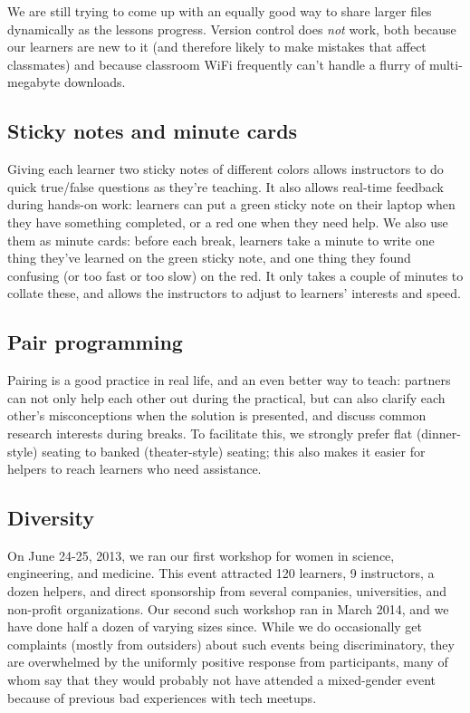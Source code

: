 \documentclass[10pt,a4paper,twocolumn]{article}
\begin{document}
We are still trying to come up with an equally good way to share
larger files dynamically as the lessons progress.  Version control
does \emph{not} work, both because our learners are new to it (and
therefore likely to make mistakes that affect classmates) and because
classroom WiFi frequently can't handle a flurry of multi-megabyte
downloads.

\subsection*{Sticky notes and minute cards}

Giving each learner two sticky notes of different colors allows
instructors to do quick true/false questions as they're teaching. It
also allows real-time feedback during hands-on work: learners can put
a green sticky note on their laptop when they have something
completed, or a red one when they need help. We also use them as
minute cards: before each break, learners take a minute to write one
thing they've learned on the green sticky note, and one thing they
found confusing (or too fast or too slow) on the red. It only takes a
couple of minutes to collate these, and allows the instructors to
adjust to learners' interests and speed.

\subsection*{Pair programming}

Pairing is a good practice in real life, and an even better way to
teach: partners can not only help each other out during the practical,
but can also clarify each other's misconceptions when the solution is
presented, and discuss common research interests during breaks. To
facilitate this, we strongly prefer flat (dinner-style) seating to
banked (theater-style) seating; this also makes it easier for helpers
to reach learners who need assistance.

\subsection*{Diversity}

On June 24-25, 2013, we ran our first workshop for women in science,
engineering, and medicine. This event attracted 120 learners, 9
instructors, a dozen helpers, and direct sponsorship from several
companies, universities, and non-profit organizations. Our second such
workshop ran in March 2014, and we have done half a dozen of varying
sizes since.  While we do occasionally get complaints (mostly from
outsiders) about such events being discriminatory, they are
overwhelmed by the uniformly positive response from participants, many
of whom say that they would probably not have attended a mixed-gender
event because of previous bad experiences with tech meetups.
\end{document}
